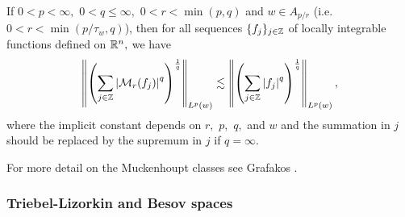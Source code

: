 \begin{theorem}
If $0<p<\infty,$ $0<q\le \infty,$  $0<r <\min(p,q)$ and $w \in A_{p/r}$ (i.e. $0<r<\min(p/\tau_w,q)$), then for all sequences $\{f_{j}\}_{j\in\mathbb{Z}}$ of locally integrable functions defined on ${{\mathbb R}^n},$ we have
 \begin{equation*}
 \left\|\left(\sum_{j\in\mathbb{Z}}\left\vert \mathcal{M}_r (f_j) \right\vert^q\right)^{\frac{1}{q}}\right\|_{L^{p}(w)}\lesssim
 \left\|\left(\sum_{j\in\mathbb{Z}}\left\vert f_j \right\vert^q\right)^{\frac{1}{q}}\right\|_{L^{p}(w)},\label{eq:wFS}
 \end{equation*}
where the implicit constant depends on $r,$ $p,$ $q,$ and $w$ and the summation in $j$ should be replaced by the supremum in $j$ if $q=\infty.$
\end{theorem}
For more detail on the Muckenhoupt classes see Grafakos \cite{MR3243741}.

\subsubsection{Triebel-Lizorkin and Besov spaces}
